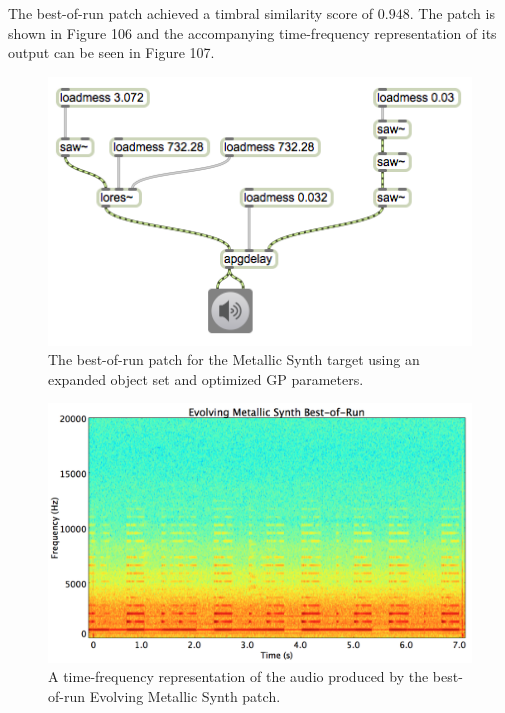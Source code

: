 \documentclass[12pt]{report} 	%
\numberwithin{figure}{chapter}
\numberwithin{table}{chapter}
\numberwithin{equation}{chapter}
\begin{document}
\begin{flushleft}
The best-of-run patch achieved a timbral similarity score of $0.948$. The patch is shown in Figure 106 and the accompanying time-frequency representation of its output can be seen in Figure 107.
\begin{figure}[h!]
\vspace{24pt}\begin{center}
\includegraphics[width=\linewidth]{MetallicSynth_Best}
\caption[Metallic synth best-of-run patch]{The best-of-run patch for the Metallic Synth target using an expanded object set and optimized GP parameters.}
\end{center}
\vspace{6pt}
\end{figure}
\begin{figure}[h!]
\begin{center}
\includegraphics[scale=0.34]{EvolvingMetallicSynthBestOfRun}
\caption[Best-of-run evolving metallic synth time-frequency representation]{A time-frequency representation of the audio produced by the best-of-run Evolving Metallic Synth patch.}

\end{center}
\end{figure}
\end{flushleft}
\end{document}
